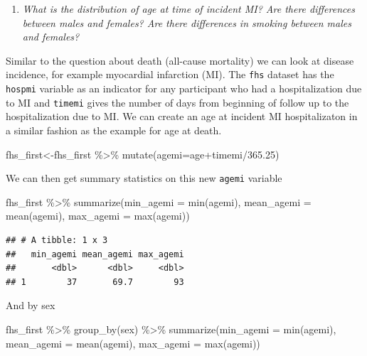 \documentclass[
]{book}
\newenvironment{Shaded}{\begin{snugshade}}{\end{snugshade}}
\newcommand{\AttributeTok}[1]{\textcolor[rgb]{0.77,0.63,0.00}{#1}}
\newcommand{\FloatTok}[1]{\textcolor[rgb]{0.00,0.00,0.81}{#1}}
\newcommand{\FunctionTok}[1]{\textcolor[rgb]{0.00,0.00,0.00}{#1}}
\newcommand{\NormalTok}[1]{#1}
\newcommand{\OtherTok}[1]{\textcolor[rgb]{0.56,0.35,0.01}{#1}}
\newcommand{\SpecialCharTok}[1]{\textcolor[rgb]{0.00,0.00,0.00}{#1}}
\providecommand{\tightlist}{%
  \setlength{\itemsep}{0pt}\setlength{\parskip}{0pt}}
\begin{document}
\begin{enumerate}
\def\labelenumi{\arabic{enumi}.}
\setcounter{enumi}{3}
\tightlist
\item
  \emph{What is the distribution of age at time of incident MI? Are there differences between males and females? Are there differences in smoking between males and females?}
\end{enumerate}

Similar to the question about death (all-cause mortality) we can look at disease incidence, for example myocardial infarction (MI). The \texttt{fhs} dataset has the \texttt{hospmi} variable as an indicator for any participant who had a hospitalization due to MI and \texttt{timemi} gives the number of days from beginning of follow up to the hospitalization due to MI. We can create an age at incident MI hospitalizaton in a similar fashion as the example for age at death.

\begin{Shaded}
\begin{Highlighting}[]
\NormalTok{fhs\_first}\OtherTok{\textless{}{-}}\NormalTok{fhs\_first }\SpecialCharTok{\%\textgreater{}\%} 
\FunctionTok{mutate}\NormalTok{(}\AttributeTok{agemi=}\NormalTok{age}\SpecialCharTok{+}\NormalTok{timemi}\SpecialCharTok{/}\FloatTok{365.25}\NormalTok{)}
\end{Highlighting}
\end{Shaded}

We can then get summary statistics on this new \texttt{agemi} variable

\begin{Shaded}
\begin{Highlighting}[]
\NormalTok{fhs\_first }\SpecialCharTok{\%\textgreater{}\%} 
\FunctionTok{summarize}\NormalTok{(}\AttributeTok{min\_agemi =} \FunctionTok{min}\NormalTok{(agemi),}
\AttributeTok{mean\_agemi =} \FunctionTok{mean}\NormalTok{(agemi),}
\AttributeTok{max\_agemi =} \FunctionTok{max}\NormalTok{(agemi))}
\end{Highlighting}
\end{Shaded}

\begin{verbatim}
## # A tibble: 1 x 3
##   min_agemi mean_agemi max_agemi
##       <dbl>      <dbl>     <dbl>
## 1        37       69.7        93
\end{verbatim}

And by sex

\begin{Shaded}
\begin{Highlighting}[]
\NormalTok{fhs\_first }\SpecialCharTok{\%\textgreater{}\%} 
\FunctionTok{group\_by}\NormalTok{(sex)  }\SpecialCharTok{\%\textgreater{}\%} 
\FunctionTok{summarize}\NormalTok{(}\AttributeTok{min\_agemi =} \FunctionTok{min}\NormalTok{(agemi),}
\AttributeTok{mean\_agemi =} \FunctionTok{mean}\NormalTok{(agemi),}
\AttributeTok{max\_agemi =} \FunctionTok{max}\NormalTok{(agemi))}
\end{Highlighting}
\end{Shaded}
\end{document}
